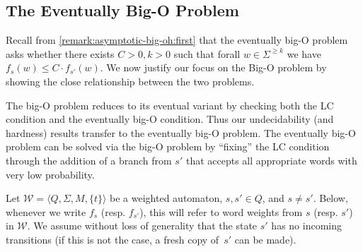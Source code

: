 \documentclass{lmcs}
\theoremstyle{plain}
\theoremstyle{definition}
\theoremstyle{remark}
\newcommand\abra[1]{\langle #1 \rangle}
\newcommand\wa{\mathcal{W}}
\renewcommand\nu{f}
\begin{document}
\subsection{The Eventually Big-O Problem}
\label{remark:asymptotic-big-oh}
Recall from \cref{remark:asymptotic-big-oh:first} that the  eventually big-O problem asks whether there exists $C> 0, k> 0$ such that forall $w \in \Sigma^{\ge k}$ we have $ \nu_s(w) \le C \cdot \nu_{s'}(w)$. We now justify our focus on the Big-O problem by showing the close relationship between the two problems.

The big-O problem reduces to its eventual variant by checking both the LC condition and the eventually big-O condition. Thus our undecidability (and hardness) results
transfer to the eventually big-O problem. The eventually big-O problem can be solved via the big-O problem by ``fixing'' the LC condition through the addition of a branch from $s'$ that accepts all appropriate words with very low probability.

Let $\wa=\abra{Q,\Sigma,M,\{t\}}$ be a weighted automaton,  $s,s'\in Q$, and $s\neq s'$.
Below, whenever we write $\nu_s$ (resp. $\nu_{s'}$), this will refer to word weights from $s$ (resp. $s'$) in $\wa$.
We assume without loss of generality that the state $s'$ has no incoming transitions
(if this is not the case, a fresh copy of~$s'$ can be made).
\end{document}
